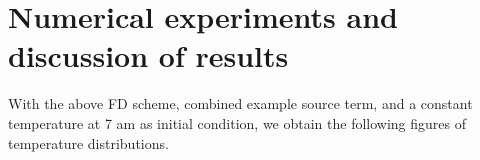 \documentclass{IEEEtran} %
\begin{document}
\section{Numerical experiments and discussion of results}
With the above FD scheme, combined example source term, and a constant temperature at 7 am as initial condition, we obtain the following figures of temperature distributions.
\begin{comment}
\begin{figure}
  \texttt{[image: fig/temp38.png]}
  \caption{For a tree with 12 inch radius, temperature distribution in the north and south aspects, with depth of about 9 inches.} 
  \label{fig:at38}
\end{figure}
\end{comment}

 
\end{document}
